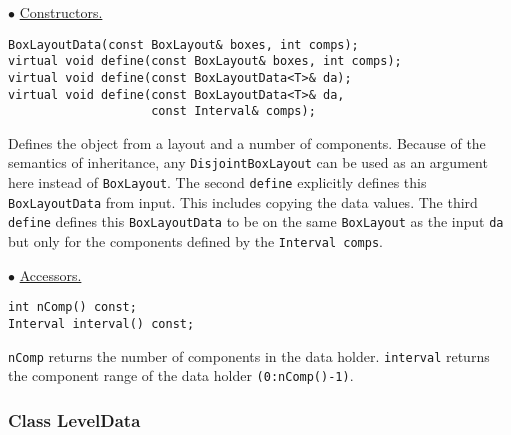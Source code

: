 \begin{trivlist}
\item $\bullet$ \underline{Constructors.}
\begin{verbatim}
BoxLayoutData(const BoxLayout& boxes, int comps);
virtual void define(const BoxLayout& boxes, int comps);
virtual void define(const BoxLayoutData<T>& da);
virtual void define(const BoxLayoutData<T>& da,
                    const Interval& comps);
\end{verbatim}
Defines the object from a layout and a number of components.
Because of the semantics of inheritance, any
\verb/DisjointBoxLayout/ can be used as an argument here instead
of \verb/BoxLayout/.
The second {\tt define} explicitly defines this {\tt BoxLayoutData} 
from input. This includes copying the data values.  
The third {\tt define} defines this {\tt BoxLayoutData}
to be on the same {\tt BoxLayout}
as the input {\tt da} but only for the components defined by 
the {\tt Interval comps}.

\item $\bullet$ \underline{Accessors.}
\begin{verbatim}
int nComp() const;
Interval interval() const;
\end{verbatim}
{\tt nComp} returns the number of components in the data holder.
{\tt interval} returns the component range of the data holder 
\verb/(0:nComp()-1)/.

\end{trivlist}

\subsubsection{Class LevelData}
\label{LevelDataSection}

